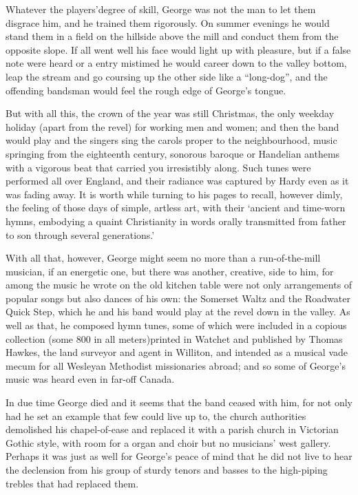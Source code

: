 Whatever the players’degree of skill, George was not the man to let them disgrace him, and he trained them rigorously. On summer evenings he would stand them in a field on the hillside above the mill and conduct them from the opposite slope. If all went well his face would light up with pleasure, but if a false note were heard or a entry mistimed he would career down to the valley bottom, leap the stream and go coursing up the other side like a “long-dog”, and the offending bandsman would feel the rough edge of George’s tongue. 

But with all this, the crown of the year was still Christmas, the only weekday holiday (apart from the revel) for working men and women; and then the band would play and the singers sing the carols proper to the neighbourhood, music springing from the eighteenth century, sonorous baroque or Handelian anthems with a vigorous beat that carried you irresistibly along. Such tunes were performed all over England, and their radiance was captured by Hardy even as it was fading away. It is worth while turning to his pages to recall, however dimly, the feeling of those days of simple, artless art, with their ‘ancient and time-worn hymns, embodying a quaint Christianity in words orally transmitted from father to son through several generations.’

With all that, however, George might seem no more than a run-of-the-mill musician, if an energetic one, but there was another, creative, side to him, for among the music he wrote on the old kitchen table were not only arrangements of popular songs but also dances of his own: the Somerset Waltz and the Roadwater Quick Step, which he and his band would play at the revel down in the valley. As well as that, he composed hymn tunes, some of which were included in a copious collection (some 800 in all meters)printed in Watchet and published by Thomas Hawkes, the land surveyor and agent in Williton, and intended as a musical vade mecum for all Wesleyan Methodist missionaries abroad; and so some of George’s music was heard even in far-off Canada.

In due time George died and it seems that the band ceased with him, for not only had he set an example that few could live up to, the church authorities demolished his chapel-of-ease and replaced it with a parish church in Victorian Gothic style, with room for a organ and choir but no musicians’ west gallery. Perhaps it was just as well for George’s peace of mind that he did not live to hear the declension from his group of sturdy tenors and basses to the high-piping trebles that had replaced them. 

